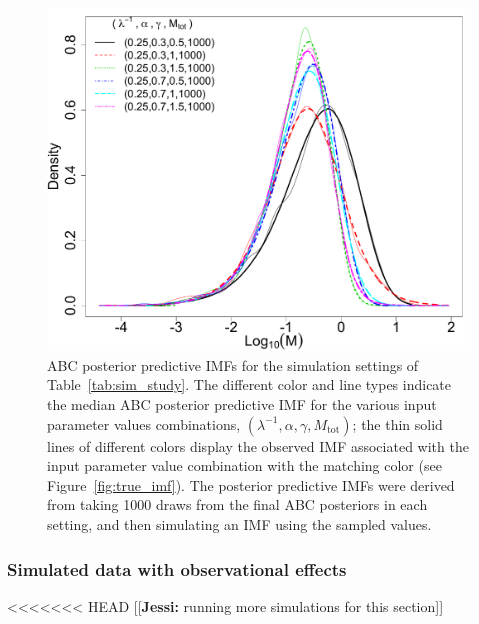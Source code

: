 \documentclass[ejs]{imsart}
\numberwithin{equation}{section}
\theoremstyle{plain}
\newcommand{\jessi}[1]{{\color{blue}[[\textbf{Jessi: }#1]]}}
\newcommand{\Mtot}{M_{\text{tot}}}
\begin{document}
\begin{figure}[htbp]
   \centering
\includegraphics[width = .5\textwidth]{figures/sim_study_imf_combined.pdf} 
   \caption{ABC posterior predictive IMFs for the simulation settings of Table~\ref{tab:sim_study}.  The different color and line types indicate the median ABC posterior predictive IMF for the various input parameter values combinations, $(\lambda^{-1}, \alpha, \gamma, \Mtot)$; the thin solid lines of different colors display the observed IMF associated with the input parameter value combination with the matching color (see Figure~\ref{fig:true_imf}).
The posterior predictive IMFs were derived from taking 1000 draws from the final ABC posteriors in each setting, and then simulating an IMF using the sampled values. 
   }
   \label{fig:abc_pa_imf}
\end{figure}





\subsubsection{Simulated data with observational effects} \label{sec:sim_obs}

<<<<<<< HEAD
\jessi{running more simulations for this section}
\end{document}
